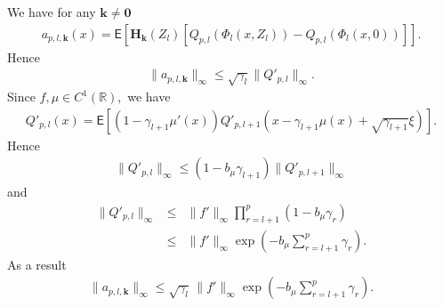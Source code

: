 \documentclass[article]{elsarticle}
\begin{document}
We have for any \(\mathbf{k}\neq \mathbf{0}\)
\begin{eqnarray*}
a_{p,l,\mathbf{k}}(x)=\mathsf{E}\left[\mathbf{H}_\mathbf{k}\left(Z_l\right)[Q_{p,l}\left(\Phi_l(x,Z_l)\right)-Q_{p,l}\left(\Phi_l(x,0)\right)]\right].
\end{eqnarray*}
Hence
\begin{eqnarray*}
\|a_{p,l,\mathbf{k}}\|_{\infty}\leq \sqrt{\gamma_l}\|Q'_{p,l}\|_{\infty}.
\end{eqnarray*}
Since \(f,\mu\in C^1(\mathbb{R}),\)  we have
\begin{eqnarray*}
Q'_{p,l}(x)=\mathsf{E}\left[(1-\gamma_{l+1}\mu'(x))Q'_{p,l+1}(x-\gamma_{l+1}\mu(x)+\sqrt{\gamma_{l+1}}\xi)\right].
\end{eqnarray*}
Hence
\begin{eqnarray*}
\|Q'_{p,l}\|_\infty\leq (1-b_{\mu}\gamma_{l+1})\|Q'_{p,l+1}\|_\infty
\end{eqnarray*}
and
\begin{eqnarray*}
\|Q'_{p,l}\|_\infty&\leq & \|f'\|_\infty\prod_{r=l+1}^p (1-b_{\mu}\gamma_{r})
\\
&\leq & \|f'\|_\infty\exp\left(-b_{\mu}\sum_{r=l+1}^p \gamma_{r}  \right).
\end{eqnarray*}
As a result
\begin{eqnarray*}
\|a_{p,l,\mathbf{k}}\|_{\infty}\leq \sqrt{\gamma_l}\, \|f'\|_\infty\exp\left(-b_{\mu}\sum_{r=l+1}^p \gamma_{r}  \right).
\end{eqnarray*}





\end{document}
